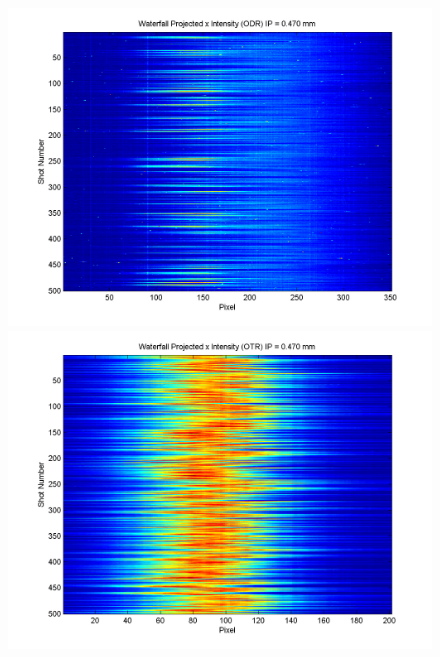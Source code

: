 \documentclass[12pt]{article}
\begin{document}
\begin{figure}
\begin{center}
\includegraphics[scale=0.5]{Figures/ProjX_wfall_ODR_470.PNG}
\includegraphics[scale=0.5]{Figures/ProjX_wfall_OTR_470.PNG}
\caption{}
\end{center}
\end{figure}
\end{document}
